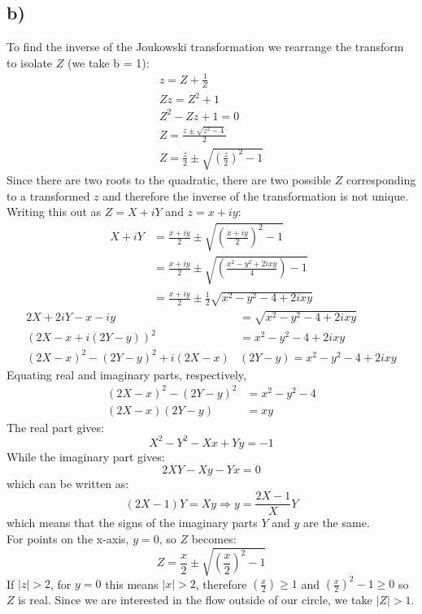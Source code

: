 \documentclass{article}
\begin{document}
\subsection*{b)}
To find the inverse of the Joukowski transformation we rearrange the transform to isolate $Z$ (we take b = 1):
\begin{align*}
    z = Z + \frac{1}{Z} \\
    Zz = Z^2 + 1 \\
    Z^2 - Zz + 1  = 0 \\
    Z = \frac{z \pm \sqrt{z^2 - 4}}{2} \\
    Z = \frac{z}{2} \pm \sqrt{\left(\frac{z}{2}\right)^2 - 1}
\end{align*}
Since there are two roots to the quadratic, there are two possible $Z$ corresponding to a transformed $z$ and therefore the inverse of the transformation is not unique.
Writing this out as $Z = X + iY$ and $z = x + iy$:
\begin{align*}
    X + iY &= \frac{x + iy}{2} \pm \sqrt{\left(\frac{x+iy}{2}\right)^2 - 1}\\
    &= \frac{x + iy}{2} \pm \sqrt{\left(\frac{x^2 - y^2 + 2ixy}{4}\right) - 1}\\
    &= \frac{x + iy}{2} \pm \frac{1}{2}\sqrt{x^2 - y^2 - 4 + 2ixy}
\end{align*}
\begin{align*}
    2X + 2iY - x - iy &= \sqrt{x^2 - y^2 - 4 + 2ixy} \\
    (2X - x + i(2Y - y))^2 &= x^2 - y^2 - 4 + 2ixy \\
    (2X - x)^2 - (2Y - y)^2 + i(2X - x)&(2Y - y) = x^2 - y^2 - 4 + 2ixy
\end{align*}
Equating real and imaginary parts, respectively,
\begin{align*}
    (2X - x)^2 - (2Y - y)^2 &= x^2 - y^2 - 4\\
    (2X - x)(2Y -y) &= xy
\end{align*}
The real part gives:
$$X^2 - Y^2 - Xx + Yy = -1$$
While the imaginary part gives:
$$2XY - Xy - Yx = 0$$
which can be written as:
$$(2X - 1)Y = Xy \Rightarrow y = \frac{2X - 1}{X}Y$$
which means that the signs of the imaginary parts $Y$ and $y$ are the same. \\
For points on the x-axis, $y = 0$, so $Z$ becomes:
$$Z = \frac{x}{2} \pm \sqrt{\left(\frac{x}{2}\right)^2 - 1}$$
If $|z| > 2$, for $y = 0$ this means $|x| > 2$, therefore $\left(\frac{x}{2}\right) \geq 1$ and $\left(\frac{x}{2}\right)^2 - 1 \geq 0$ so $Z$ is real. Since we are interested in the flow outside of our circle, we take $|Z| > 1$.
\end{document}
